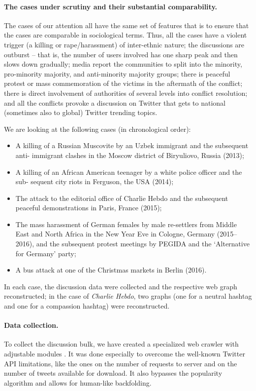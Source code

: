 \paragraph{The cases under scrutiny and their substantial comparability.} The cases of our attention all have the same set of features that is to ensure that the cases are comparable in sociological terms. Thus, all the cases have a violent trigger (a killing or rape/harassment) of inter-ethnic nature; the discussions are outburst -- that is, the number of users involved has one sharp peak and then slows down gradually; media report the communities to split into the minority, pro-minority majority, and anti-minority majority groups; there is peaceful protest or mass commemoration of the victims in the aftermath of the conflict; there is direct involvement of authorities of several levels into conflict resolution; and all the conflicts provoke a discussion on Twitter that gets to national (sometimes also to global) Twitter trending topics.

We are looking at the following cases (in chronological order):
\begin{itemize}
	\item A killing of a Russian Muscovite by an Uzbek immigrant and the subsequent anti- immigrant clashes in the Moscow district of Biryuliovo, Russia (2013);
	\item A killing of an African American teenager by a white police officer and the sub- sequent city riots in Ferguson, the USA (2014);
	\item The attack to the editorial office of Charlie Hebdo and the subsequent peaceful demonstrations in Paris, France (2015);
	\item The mass harassment of German females by male re-settlers from Middle East and North Africa in the New Year Eve in Cologne, Germany (2015--2016), and the subsequent protest meetings by PEGIDA and the ‘Alternative for Germany’ party;
	\item A bus attack at one of the Christmas markets in Berlin (2016).
\end{itemize}

In each case, the discussion data were collected and the respective web graph reconstructed; in the case of \textit{Charlie Hebdo}, two graphs (one for a neutral hashtag and one for a compassion hashtag) were reconstructed.

\paragraph{Data collection.} To collect the discussion bulk, we have created a specialized web crawler with adjustable modules \cite{BlekanovSergeevMartynenko}. It was done especially to overcome the well-known Twitter API limitations, like the ones on the number of requests to server and on the number of tweets available for download. It also bypasses the popularity algorithm and allows for human-like backfolding.

